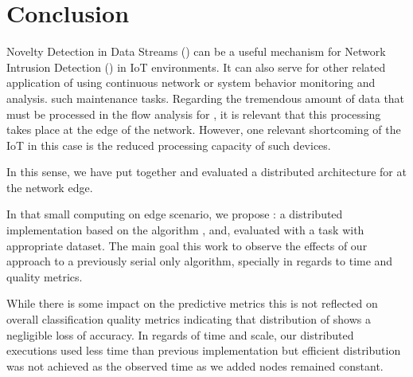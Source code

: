 
\section{Conclusion} 
\label{sec:conclusion}


Novelty Detection in Data Streams (\nd) can be a useful mechanism for Network
Intrusion Detection (\nids) in IoT environments. It can also serve for other related application of \nd using continuous
network or system behavior monitoring and analysis.
such maintenance tasks.
Regarding the tremendous amount of data that must be processed in the flow analysis for \nd, it 
is relevant that this processing takes place at the edge of the network. 
However, one relevant shortcoming of the IoT in this case is the reduced processing capacity of such devices. 

In this sense, we have put together and evaluated a distributed architecture for \nd at the network edge.

In that small computing on edge scenario, we propose \mfog: a distributed \nd
implementation based on the \nd algorithm \minas, and, evaluated with a \nids
task with appropriate dataset.
The main goal this work  to observe the effects of our approach to a
previously serial only algorithm, specially in regards to time and quality
metrics.


While there is some impact on the predictive metrics this is not reflected on
overall classification quality metrics indicating that distribution of \minas
shows a negligible loss of accuracy.
In regards of time and scale, our distributed executions used less time than
previous implementation but efficient distribution was not achieved as the
observed time as we added nodes remained constant.

